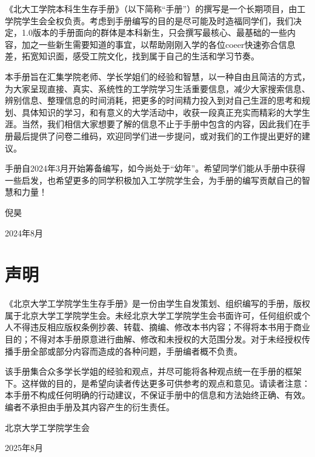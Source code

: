 \documentclass[11pt,oneside]{book}
\begin{document}
《北大工学院本科生生存手册》（以下简称“手册”）的撰写是一个长期项目，由工学院学生会全权负责。考虑到手册编写的目的是尽可能及时造福同学们，我们决定，1.0版本的手册面向的群体是本科新生，只会撰写最核心、最基础的一些内容，加之一些新生需要知道的事宜，以帮助刚刚入学的各位coeer快速弥合信息差，拓宽知识面，感受工院文化，找到属于自己的生活和学习节奏。

\vspace{10pt}

本手册旨在汇集学院老师、学长学姐们的经验和智慧，以一种自由且简洁的方式，为大家呈现直接、真实、系统性的工学院学习生活重要信息，减少大家搜索信息、辨别信息、整理信息的时间消耗，把更多的时间精力投入到对自己生涯的思考和规划、具体知识的学习，和有意义的大学活动中，收获一段真正充实而精彩的大学生涯。当然，我们相信大家想要了解的信息不止于手册中包含的内容，因此我们在手册最后提供了问卷二维码，欢迎同学们进一步提问，或对我们的工作提出更好的建议。

\vspace{10pt}

手册自2024年3月开始筹备编写，如今尚处于“幼年”。希望同学们能从手册中获得一些启发，也希望更多的同学积极加入工学院学生会，为手册的编写贡献自己的智慧和力量！
\begin{flushright}
	倪昊
	
	2024年8月
\end{flushright}


\chapter*{声明}

《北京大学工学院学生生存手册》是一份由学生自发策划、组织编写的手册，版权属于北京大学工学院学生会。未经北京大学工学院学生会书面许可，任何组织或个人不得违反相应版权条例抄袭、转载、摘编、修改本书内容；不得将本书用于商业目的；不得对本手册原意进行曲解、修改和未授权的大范围分发。对于未经授权传播手册全部或部分内容而造成的各种问题，手册编者概不负责。

\vspace{10pt}

该手册集合众多学长学姐的经验和观点，并尽可能将各种观点统一在手册的框架下。这样做的目的，是希望向读者传达更多可供参考的观点和意见。请读者注意：本手册不构成任何明确的行动建议，不保证手册中的信息和方法始终正确、有效。编者不承担由手册及其内容产生的衍生责任。
\begin{flushright}
	北京大学工学院学生会
	
	2025年8月
\end{flushright}
\end{document}

